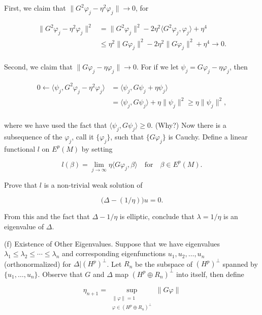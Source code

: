 \begin{problemset}
First, we claim that  $ \|G^2\varphi_j - \eta^2\varphi_j\| \to 0 $, for

\[
\begin{aligned}{\|G^{2}\varphi_{j}-\eta^{2}\varphi_{j}\|^{2}}&{{}=\|G^{2}\varphi_{j}\|^{2}-2\eta^{2}\langle G^{2}\varphi_{j},\varphi_{j}\rangle+\eta^{4}}\\ {}&{{}\leq\eta^{2}\|G\varphi_{j}\|^{2}-2\eta^{2}\|G\varphi_{j}\|^{2}+\eta^{4}\to0.}\\ \end{aligned}
\]

Second, we claim that $\|G\varphi_j - \eta\varphi_j\| \to 0$. For if we let $\psi_j = G\varphi_j - \eta\varphi_j$, then

\[
\begin{aligned}{0\leftarrow\langle\psi_{j},G^{2}\varphi_{j}-\eta^{2}\varphi_{j}\rangle}&{{}=\langle\psi_{j},G\psi_{j}+\eta\psi_{j}\rangle}\\
{}&{{}=\langle\psi_{j},G\psi_{j}\rangle+\eta\|\psi_{j}\|^{2}\geq\eta\|\psi_{j}\|^{2},}\\
\end{aligned}
\]

where we have used the fact that $\langle\psi_{j},G\psi_{j}\rangle\geq0$. (Why?) Now there is a subsequence of the $\varphi_j$, call it $\{\varphi_j\}$, such that $\{G\varphi_j\}$ is Cauchy. Define a linear functional $l$ on $E^p(M)$ by setting

\[
l(\beta)=\lim_{j\to\infty}\eta\langle G\varphi_{j},\beta\rangle\quad\text{for}\quad\beta\in E^{p}(M).
\]

Prove that $l$ is a non-trivial weak solution of

\[
\big(\Delta-(1/\eta)\big)u=0.
\]

From this and the fact that  $ \Delta - 1/\eta $ is elliptic, conclude that  $ \lambda = 1/\eta $ is an eigenvalue of  $ \Delta $.

(f) Existence of Other Eigenvalues. Suppose that we have eigenvalues  $ \lambda_1 \leq \lambda_2 \leq \cdots \leq \lambda_n $ and corresponding eigenfunctions  $ u_1, u_2, \ldots, u_n $ (orthonormalized) for  $ \Delta \big| (H^p)^{\perp}  $. Let  $ R_n $ be the subspace of  $ (H^p)^{\perp} $ spanned by  $ \{u_1, \ldots, u_n\} $. Observe that  $ G $ and  $ \Delta $ map  $ (H^p \oplus R_n)^{\perp} $ into itself, then define

\[
\eta_{n+1}=\sup_{\substack{\|\varphi\|=1\\ \varphi\in(H^{p}\oplus R_{n})^{\perp}}}\|G\varphi\|
\]


\end{problemset}
